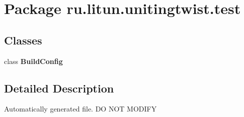 \section{Package ru.\+litun.\+unitingtwist.\+test}
\label{namespaceru_1_1litun_1_1unitingtwist_1_1test}
\subsection*{Classes}
\begin{DoxyCompactItemize}
\item 
class \textbf{ Build\+Config}
\end{DoxyCompactItemize}


\subsection{Detailed Description}
Automatically generated file. DO N\+OT M\+O\+D\+I\+FY 